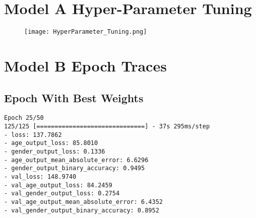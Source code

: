 \appendix
{}
\section{Model A Hyper-Parameter Tuning} \label{appendix:Model_A_Hyper-Parameter_Tuning}
\begin{figure}[h!]
    \centering
    \texttt{[image: HyperParameter\_Tuning.png]}
    \label{fig:modelA_hyperparam_tuning}
\end{figure}

\section{Model B Epoch Traces}
\subsection{Epoch With Best Weights}\label{appendix:modelB_best_epoch}
\begin{verbatim}
Epoch 25/50
125/125 [==============================] - 37s 295ms/step 
- loss: 137.7862 
- age_output_loss: 85.8010 
- gender_output_loss: 0.1336 
- age_output_mean_absolute_error: 6.6296 
- gender_output_binary_accuracy: 0.9495 
- val_loss: 148.9740 
- val_age_output_loss: 84.2459 
- val_gender_output_loss: 0.2754 
- val_age_output_mean_absolute_error: 6.4352 
- val_gender_output_binary_accuracy: 0.8952
\end{verbatim}

